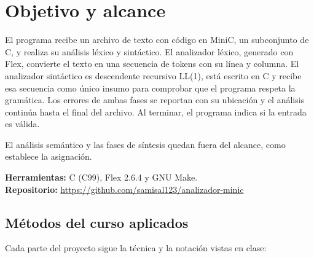 \documentclass[12pt]{article}
\begin{document}
\setcounter{page}{1}
{\setlength{\parskip}{0pt}\tableofcontents}
\newpage

\section{Objetivo y alcance}

El programa recibe un archivo de texto con código en MiniC, un subconjunto de C, y realiza su
análisis léxico y sintáctico. El analizador léxico, generado con Flex, convierte el texto en una
secuencia de tokens con su línea y columna. El analizador sintáctico es descendente recursivo
LL(1), está escrito en C y recibe esa secuencia como único insumo para comprobar que el programa
respeta la gramática. Los errores de ambas fases se reportan con su ubicación y el análisis
continúa hasta el final del archivo. Al terminar, el programa indica si la entrada es válida.

El análisis semántico y las fases de síntesis quedan fuera del alcance, como establece la
asignación.

\noindent\textbf{Herramientas:} C (C99), Flex 2.6.4 y GNU Make.\\
\noindent\textbf{Repositorio:} \url{https://github.com/samisal123/analizador-minic}

\subsection{Métodos del curso aplicados}

Cada parte del proyecto sigue la técnica y la notación vistas en clase:
\end{document}
